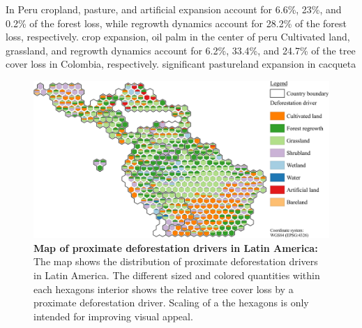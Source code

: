 			In Peru cropland, pasture, and artificial expansion account for 6.6\%, 23\%, and 0.2\% of the forest loss, while regrowth dynamics account for 28.2\% of the forest loss, respectively. \citep{Sy2015} crop expansion, \citep{Vijay2018,Furumo2017} oil palm in the center of peru 
			Cultivated land, grassland, and regrowth dynamics account for 6.2\%, 33.4\%, and 24.7\% of the tree cover loss in Colombia, respectively. \citep{Graesser2015} significant pastureland expansion in cacqueta
			\begin{figure}[ht]
				\centering
				\includegraphics[scale=1]{img/americas_driver_frameless}
				\caption[Map of proximate deforestation drivers in Latin America]{\textbf{Map of proximate deforestation drivers in Latin America:} The map shows the distribution of proximate deforestation drivers in Latin America. The different sized and colored quantities within each hexagons interior shows the relative tree cover loss by a proximate deforestation driver. Scaling of a the hexagons is only intended for improving visual appeal.}
				\label{fig:americas_driver}
			\end{figure}

